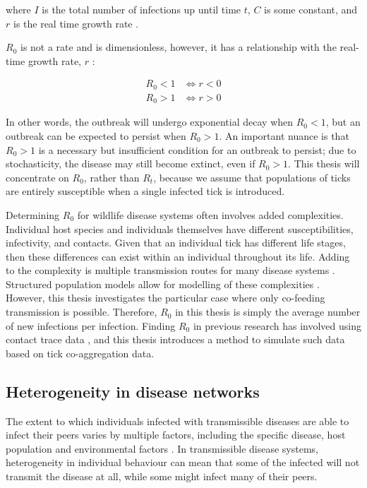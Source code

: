 \documentclass{article}
\begin{document}
where $ I $ is the total number of infections up until time $ t $, $ C $ is some constant, and $ r $ is the real time growth rate \cite{Diekman2000}.

$ R_0 $ is not a rate and is dimensionless, however, it has a relationship with the real-time growth rate, $ r $ \cite{Diekman2000}:

\begin{align}\label{R0}
  R_0 < 1 &\iff r < 0 \nonumber \\
  R_0 > 1 &\iff r > 0
\end{align}

In other words, the outbreak will undergo exponential decay when $ R_0 < 1 $, but an outbreak can be expected to persist when $ R_0 > 1 $. An important nuance is that $ R_0 > 1 $ is a necessary but insufficient condition for an outbreak to persist; due to stochasticity, the disease may still become extinct, even if $ R_0 > 1 $. This thesis will concentrate on $ R_0 $, rather than $ R_t $, because we assume that populations of ticks are entirely susceptible when a single infected tick is introduced.

Determining $ R_0 $ for wildlife disease systems often involves added complexities. Individual host species and individuals themselves have different susceptibilities, infectivity, and contacts. Given that an individual tick has different life stages, then these differences can exist within an individual throughout its life. Adding to the complexity is multiple transmission routes for many disease systems \cite{Hartemink2008}. Structured population models allow for modelling of these complexities \cite{Diekman2000}. However, this thesis investigates the particular case where only co-feeding transmission is possible. Therefore, $ R_0 $ in this thesis is simply the average number of new infections per infection. Finding $ R_0 $ in previous research has involved using contact trace data \cite{LloydSmith2005}, and this thesis introduces a method to simulate such data based on tick co-aggregation data.

\subsection{Heterogeneity in disease networks}

The extent to which individuals infected with transmissible diseases are able to infect their peers varies by multiple factors, including the specific disease, host population and environmental factors \cite{LloydSmith2005}. In transmissible disease systems, heterogeneity in individual behaviour can mean that some of the infected will not transmit the disease at all, while some might infect many of their peers.
\end{document}
